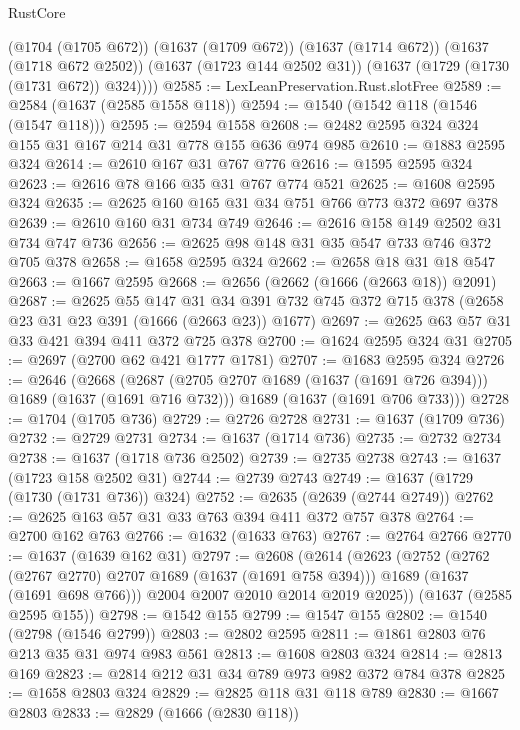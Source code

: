 \begin{lexlean}{RustCore}
\begin{coremodule}
        (@1704 (@1705 @672))
        (@1637 (@1709 @672))
        (@1637 (@1714 @672))
        (@1637 (@1718 @672 @2502))
        (@1637 (@1723 @144 @2502 @31))
        (@1637 (@1729 (@1730 (@1731 @672)) @324))))
@2585 := LexLeanPreservation.Rust.slotFree
@2589 := @2584 (@1637 (@2585 @1558 @118))
@2594 := @1540 (@1542 @118 (@1546 (@1547 @118)))
@2595 := @2594 @1558
@2608 := @2482 @2595 @324 @324 @155 @31 @167 @214 @31 @778 @155 @636 @974 @985
@2610 := @1883 @2595 @324
@2614 := @2610 @167 @31 @767 @776
@2616 := @1595 @2595 @324
@2623 := @2616 @78 @166 @35 @31 @767 @774 @521
@2625 := @1608 @2595 @324
@2635 := @2625 @160 @165 @31 @34 @751 @766 @773 @372 @697 @378
@2639 := @2610 @160 @31 @734 @749
@2646 := @2616 @158 @149 @2502 @31 @734 @747 @736
@2656 := @2625 @98 @148 @31 @35 @547 @733 @746 @372 @705 @378
@2658 := @1658 @2595 @324
@2662 := @2658 @18 @31 @18 @547
@2663 := @1667 @2595
@2668 := @2656 (@2662 (@1666 (@2663 @18)) @2091)
@2687 := @2625
    @55
    @147
    @31
    @34
    @391
    @732
    @745
    @372
    @715
    @378
    (@2658 @23 @31 @23 @391 (@1666 (@2663 @23)) @1677)
@2697 := @2625 @63 @57 @31 @33 @421 @394 @411 @372 @725 @378
@2700 := @1624 @2595 @324 @31
@2705 := @2697 (@2700 @62 @421 @1777 @1781)
@2707 := @1683 @2595 @324
@2726 := @2646
    (@2668
      (@2687 (@2705 @2707 @1689 (@1637 (@1691 @726 @394))) @1689 (@1637 (@1691 @716 @732)))
      @1689
      (@1637 (@1691 @706 @733)))
@2728 := @1704 (@1705 @736)
@2729 := @2726 @2728
@2731 := @1637 (@1709 @736)
@2732 := @2729 @2731
@2734 := @1637 (@1714 @736)
@2735 := @2732 @2734
@2738 := @1637 (@1718 @736 @2502)
@2739 := @2735 @2738
@2743 := @1637 (@1723 @158 @2502 @31)
@2744 := @2739 @2743
@2749 := @1637 (@1729 (@1730 (@1731 @736)) @324)
@2752 := @2635 (@2639 (@2744 @2749))
@2762 := @2625 @163 @57 @31 @33 @763 @394 @411 @372 @757 @378
@2764 := @2700 @162 @763
@2766 := @1632 (@1633 @763)
@2767 := @2764 @2766
@2770 := @1637 (@1639 @162 @31)
@2797 := @2608
    (@2614
      (@2623
        (@2752
          (@2762 (@2767 @2770) @2707 @1689 (@1637 (@1691 @758 @394)))
          @1689
          (@1637 (@1691 @698 @766)))
        @2004
        @2007
        @2010
        @2014
        @2019
        @2025))
    (@1637 (@2585 @2595 @155))
@2798 := @1542 @155
@2799 := @1547 @155
@2802 := @1540 (@2798 (@1546 @2799))
@2803 := @2802 @2595
@2811 := @1861 @2803 @76 @213 @35 @31 @974 @983 @561
@2813 := @1608 @2803 @324
@2814 := @2813 @169
@2823 := @2814 @212 @31 @34 @789 @973 @982 @372 @784 @378
@2825 := @1658 @2803 @324
@2829 := @2825 @118 @31 @118 @789
@2830 := @1667 @2803
@2833 := @2829 (@1666 (@2830 @118))

\end{coremodule}
\end{lexlean}
